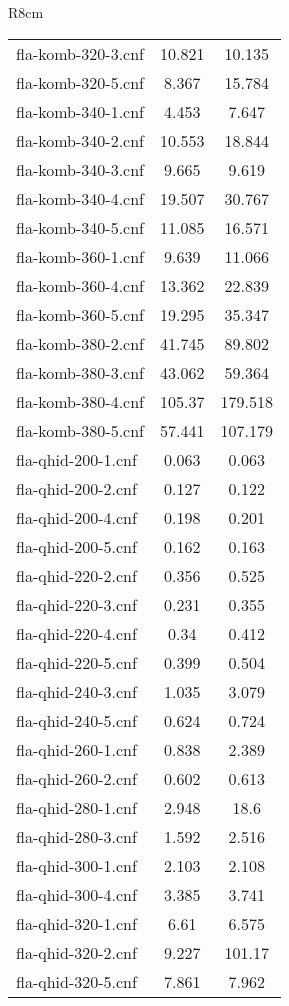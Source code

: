 \begin{wraptable}{R}{8cm}
\begin{tabular}{l| c c }
fla-komb-320-3.cnf & 10.821 & 10.135 \\
fla-komb-320-5.cnf & 8.367 & 15.784 \\
fla-komb-340-1.cnf & 4.453 & 7.647 \\
fla-komb-340-2.cnf & 10.553 & 18.844 \\
fla-komb-340-3.cnf & 9.665 & 9.619 \\
fla-komb-340-4.cnf & 19.507 & 30.767 \\
fla-komb-340-5.cnf & 11.085 & 16.571 \\
fla-komb-360-1.cnf & 9.639 & 11.066 \\
fla-komb-360-4.cnf & 13.362 & 22.839 \\
fla-komb-360-5.cnf & 19.295 & 35.347 \\
fla-komb-380-2.cnf & 41.745 & 89.802 \\
fla-komb-380-3.cnf & 43.062 & 59.364 \\
fla-komb-380-4.cnf & 105.37 & 179.518 \\
fla-komb-380-5.cnf & 57.441 & 107.179 \\
fla-qhid-200-1.cnf & 0.063 & 0.063 \\
fla-qhid-200-2.cnf & 0.127 & 0.122 \\
fla-qhid-200-4.cnf & 0.198 & 0.201 \\
fla-qhid-200-5.cnf & 0.162 & 0.163 \\
fla-qhid-220-2.cnf & 0.356 & 0.525 \\
fla-qhid-220-3.cnf & 0.231 & 0.355 \\
fla-qhid-220-4.cnf & 0.34 & 0.412 \\
fla-qhid-220-5.cnf & 0.399 & 0.504 \\
fla-qhid-240-3.cnf & 1.035 & 3.079 \\
fla-qhid-240-5.cnf & 0.624 & 0.724 \\
fla-qhid-260-1.cnf & 0.838 & 2.389 \\
fla-qhid-260-2.cnf & 0.602 & 0.613 \\
fla-qhid-280-1.cnf & 2.948 & 18.6 \\
fla-qhid-280-3.cnf & 1.592 & 2.516 \\
fla-qhid-300-1.cnf & 2.103 & 2.108 \\
fla-qhid-300-4.cnf & 3.385 & 3.741 \\
\fi
fla-qhid-320-1.cnf & 6.61 & 6.575 \\
fla-qhid-320-2.cnf & 9.227 & 101.17 \\
fla-qhid-320-5.cnf & 7.861 & 7.962 \\

\end{tabular}
\end{wraptable}
